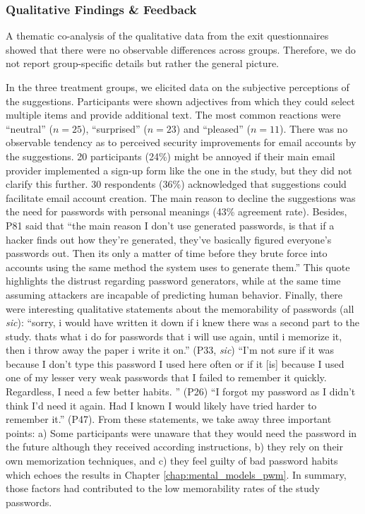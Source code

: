 \subsubsection{Qualitative Findings \& Feedback}
A thematic co-analysis of the qualitative data from the exit questionnaires showed that there were no observable differences across groups. Therefore, we do not report group-specific details but rather the general picture.  %

In the three treatment groups, we elicited data on the subjective perceptions of the suggestions. Participants were shown adjectives from which they could select multiple items and provide additional text. The most common reactions were ``neutral'' ($n=25$), ``surprised'' ($n=23$) and ``pleased'' ($n=11$). There was no observable tendency as to perceived security improvements for email accounts by the suggestions. 20 participants (24\%) might be annoyed if their main email provider implemented a sign-up form like the one in the study, but they did not clarify this further. 30 respondents (36\%) acknowledged that suggestions could facilitate email account creation. The main reason to decline the suggestions was the need for passwords with personal meanings (43\% agreement rate). 
Besides, P81 said that ``the main reason I don't use generated passwords, is that if a hacker finds out how they're generated, they've basically figured everyone's passwords out. Then its only a matter of time before they brute force into accounts using the same method the system uses to generate them.'' This quote highlights the distrust regarding password generators, while at the same time assuming attackers are incapable of predicting human behavior.
Finally, there were interesting qualitative statements about the memorability of passwords (all \textit{sic}): ``sorry, i would have written it down if i knew there was a second part to the study. thats what i do for passwords that i will use again, until i memorize it, then i throw away the paper i write it on.'' (P33, \textit{sic}) ``I'm not sure if it was because I don't type this password I used here often or if it [is] because I used one of my lesser very weak passwords that I failed to remember it quickly. Regardless, I need a few better habits. '' (P26) ``I forgot my password as I didn't think I'd need it again. Had I known I would likely have tried harder to remember it.'' (P47). From these statements, we take away three important points: a) Some participants were unaware that they would need the password in the future although they received according instructions, b) they rely on their own memorization techniques, and c) they feel guilty of bad password habits which echoes the results in Chapter \ref{chap:mental_models_pwm}. In summary, those factors had contributed to the low memorability rates of the study passwords. 

